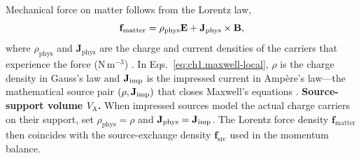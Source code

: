 Mechanical force on matter follows from the Lorentz law,
\begin{equation}
\label{eq:ch1.lorentz-force}
\mathbf{f}_{\mathrm{matter}}=\rho_{\mathrm{phys}}\mathbf{E}+\mathbf{J}_{\mathrm{phys}}\times\mathbf{B},
\end{equation}
where $\rho_{\mathrm{phys}}$ and $\mathbf{J}_{\mathrm{phys}}$ are the charge and current densities of the carriers that experience the force (N\,m$^{-3}$) \cite{maxwell1873,stratton1941}.
In Eqs.~\eqref{eq:ch1.maxwell-local}, $\rho$ is the charge density in Gauss's law and $\mathbf{J}_{\mathrm{imp}}$ is the impressed current in Amp\`ere's law---the mathematical source pair $(\rho,\mathbf{J}_{\mathrm{imp}})$ that closes Maxwell's equations \cite{maxwell1873,stratton1941}.
\textbf{Source-support volume $V_{\mathrm{A}}$.} When impressed sources model the actual charge carriers on their support, set $\rho_{\mathrm{phys}}=\rho$ and $\mathbf{J}_{\mathrm{phys}}=\mathbf{J}_{\mathrm{imp}}$. The Lorentz force density $\mathbf{f}_{\mathrm{matter}}$ then coincides with the source-exchange density $\mathbf{f}_{\mathrm{src}}$ used in the momentum balance.

